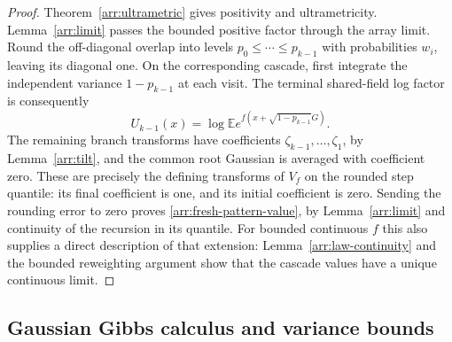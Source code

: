 \begin{proof}
Theorem~\ref{arr:ultrametric} gives positivity and ultrametricity.
Lemma~\ref{arr:limit} passes the bounded positive factor through the array
limit.  Round the off-diagonal overlap into levels
$p_0\leq\cdots\leq p_{k-1}$ with probabilities $w_i$, leaving its
diagonal one.  On the corresponding cascade, first integrate the
independent variance $1-p_{k-1}$ at each visit.  The terminal shared-field
log factor is consequently
\[
 U_{k-1}(x)=\log\mathbb E
      e^{f(x+\sqrt{1-p_{k-1}}G)}.
\]
The remaining branch transforms have coefficients
$\zeta_{k-1},\ldots,\zeta_1$, by Lemma~\ref{arr:tilt}, and the common
root Gaussian is averaged with coefficient zero.  These are precisely
the defining transforms of $V_f$ on the rounded step quantile: its final
coefficient is one, and its initial coefficient is zero.  Sending the
rounding error to zero proves \eqref{arr:fresh-pattern-value}, by
Lemma~\ref{arr:limit} and continuity of the recursion in its quantile.
For bounded continuous $f$ this also supplies a direct description of
that extension: Lemma~\ref{arr:law-continuity} and the bounded reweighting
argument show that the cascade values have a unique continuous limit.
\end{proof}

\subsection{Gaussian Gibbs calculus and variance bounds}

